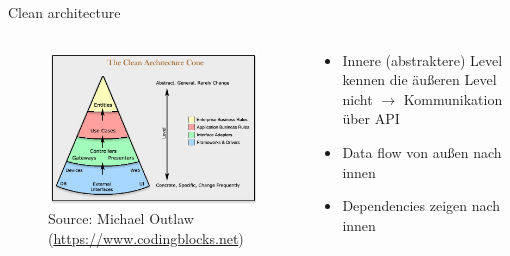 \documentclass{beamer}
\begin{document}
\begin{frame}{Clean architecture}



\begin{columns}
 
\begin{column}{0.65\textwidth}
 \begin{figure}
 \includegraphics[width=\textwidth]{pics/Clean_architecture_cone.jpeg}
\caption{Source: Michael Outlaw (\url{https://www.codingblocks.net})}
\end{figure} 
\end{column}

\begin{column}{0.45\textwidth}
 
 \begin{itemize}
  \item Innere (abstraktere) Level kennen die äußeren Level nicht $\rightarrow$ Kommunikation über API
  \item Data flow von außen nach innen
  \item Dependencies zeigen nach innen
 \end{itemize}
\end{column}
\end{columns}
\vspace{15pt}
\end{frame}
\end{document}
